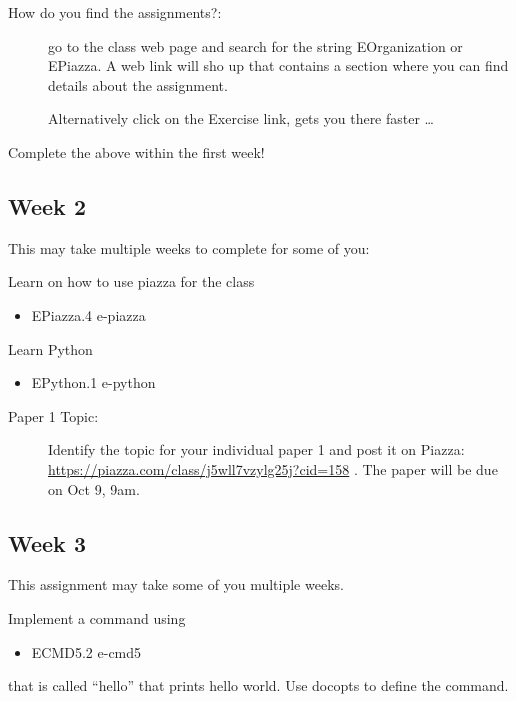 \begin{description}
\item[How do you find the assignments?:]
go to the class web page and search for the string EOrganization or
EPiazza. A web link will sho up that contains a section where you can
find details about the assignment.

Alternatively click on the Exercise link, gets you there faster \ldots{}
\end{description}

Complete the above within the first week!

\subsection{Week 2}\label{week-2}

This may take multiple weeks to complete for some of you:

Learn on how to use piazza for the class

\begin{itemize}
\tightlist
\item
  EPiazza.4 e-piazza
\end{itemize}

Learn Python

\begin{itemize}
\tightlist
\item
  EPython.1 e-python
\end{itemize}

\begin{description}
\item[Paper 1 Topic:]
Identify the topic for your individual paper 1 and post it on Piazza:
\url{https://piazza.com/class/j5wll7vzylg25j?cid=158} . The paper will
be due on Oct 9, 9am.
\end{description}

\subsection{Week 3}\label{week-3}

This assignment may take some of you multiple weeks.

Implement a command using

\begin{itemize}
\tightlist
\item
  ECMD5.2 e-cmd5
\end{itemize}

that is called ``hello'' that prints hello world. Use docopts to define
the command.

